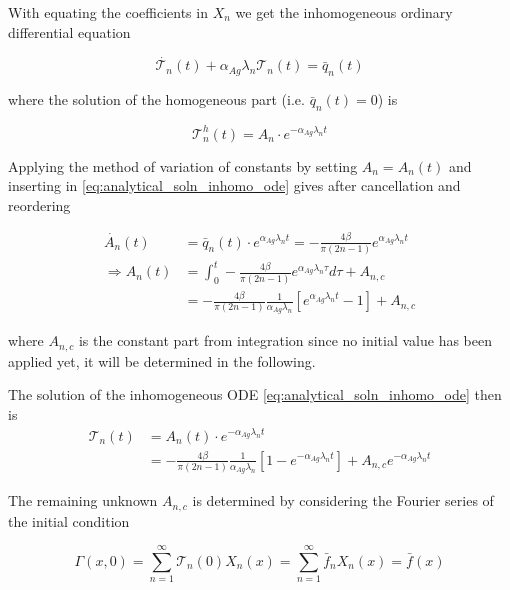 \documentclass{scrartcl}[12pt, halfparskip]
\numberwithin{equation}{section}
\numberwithin{figure}{section}
\numberwithin{table}{section}
\begin{document}
With equating the coefficients in $X_n$ we get the inhomogeneous ordinary differential equation

\begin{equation}
	\dot{\mathcal{T}_n}(t) + \alpha_{Ag} \lambda_n \mathcal{T}_n(t) = \bar{q}_n(t)
	\label{eq:analytical_soln_inhomo_ode}
\end{equation}

where the solution of the homogeneous part (i.e. $\bar{q}_n(t) = 0$) is

\begin{equation}
	\mathcal{T}_n^h(t) = A_n \cdot e^{-\alpha_{Ag} \lambda_n t}
\end{equation}

Applying the method of variation of constants by setting $A_n = A_n(t)$ and inserting in \cref{eq:analytical_soln_inhomo_ode} gives after cancellation and reordering

\begin{align}
	\dot{A_n}(t) & = \bar{q}_n(t) \cdot e^{\alpha_{Ag} \lambda_n t} = -\frac{4 \beta}{\pi (2n - 1)} e^{\alpha_{Ag} \lambda_n t} \\
	\Rightarrow A_n(t) & = \int_{0}^{t} -\frac{4 \beta}{\pi (2n - 1)} e^{\alpha_{Ag} \lambda_n \tau} d \tau + A_{n,c} \\
	& = -\frac{4 \beta}{\pi (2n - 1)} \frac{1}{\alpha_{Ag} \lambda_n} \left[ e^{\alpha_{Ag} \lambda_n t} - 1 \right] + A_{n,c}
\end{align}

where $A_{n,c}$ is the constant part from integration since no initial value has been applied yet, it will be determined in the following.

The solution of the inhomogeneous ODE \cref{eq:analytical_soln_inhomo_ode} then is
\begin{align}
	\mathcal{T}_n(t) & = A_n(t) \cdot e^{-\alpha_{Ag} \lambda_n t}  \\
	& = -\frac{4 \beta}{\pi (2n - 1)} \frac{1}{\alpha_{Ag} \lambda_n} \left[1 - e^{-\alpha_{Ag} \lambda_n t} \right] + A_{n,c} e^{- \alpha_{Ag} \lambda_n t} \nonumber
\end{align}

The remaining unknown $A_{n,c}$ is determined by considering the Fourier series of the initial condition

\begin{equation}
	\Gamma(x,0) = \sum_{n=1}^{\infty} \mathcal{T}_n(0) X_n(x) = \sum_{n=1}^{\infty} \bar{f}_n X_n(x) = \bar{f}(x)
\end{equation}
\end{document}
